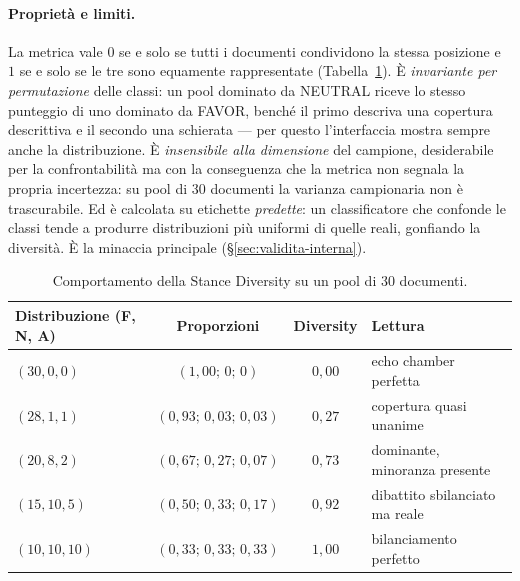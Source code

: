 \documentclass[11pt,a4paper]{report}
\begin{document}
\paragraph{Proprietà e limiti.} La metrica vale $0$ se e solo se tutti i documenti condividono la
stessa posizione e $1$ se e solo se le tre sono equamente rappresentate
(Tabella~\ref{tab:diversity-esempi}). È \emph{invariante per permutazione} delle classi: un pool
dominato da NEUTRAL riceve lo stesso punteggio di uno dominato da FAVOR, benché il primo descriva
una copertura descrittiva e il secondo una schierata --- per questo l'interfaccia mostra sempre
anche la distribuzione. È \emph{insensibile alla dimensione} del campione, desiderabile per la
confrontabilità ma con la conseguenza che la metrica non segnala la propria incertezza: su pool di
30 documenti la varianza campionaria non è trascurabile. Ed è calcolata su etichette
\emph{predette}: un classificatore che confonde le classi tende a produrre distribuzioni più
uniformi di quelle reali, gonfiando la diversità. È la minaccia principale
(\S\ref{sec:validita-interna}).

\begin{table}[t]
\centering
\small
\begin{tabular}{lccl}
\toprule
\textbf{Distribuzione (F, N, A)} & \textbf{Proporzioni} & \textbf{Diversity} & \textbf{Lettura} \\
\midrule
$(30,0,0)$ & $(1{,}00;\,0;\,0)$ & $0{,}00$ & echo chamber perfetta \\
$(28,1,1)$ & $(0{,}93;\,0{,}03;\,0{,}03)$ & $0{,}27$ & copertura quasi unanime \\
$(20,8,2)$ & $(0{,}67;\,0{,}27;\,0{,}07)$ & $0{,}73$ & dominante, minoranza presente \\
$(15,10,5)$ & $(0{,}50;\,0{,}33;\,0{,}17)$ & $0{,}92$ & dibattito sbilanciato ma reale \\
$(10,10,10)$ & $(0{,}33;\,0{,}33;\,0{,}33)$ & $1{,}00$ & bilanciamento perfetto \\
\bottomrule
\end{tabular}
\caption{Comportamento della Stance Diversity su un pool di 30 documenti.}
\label{tab:diversity-esempi}
\end{table}
\end{document}
